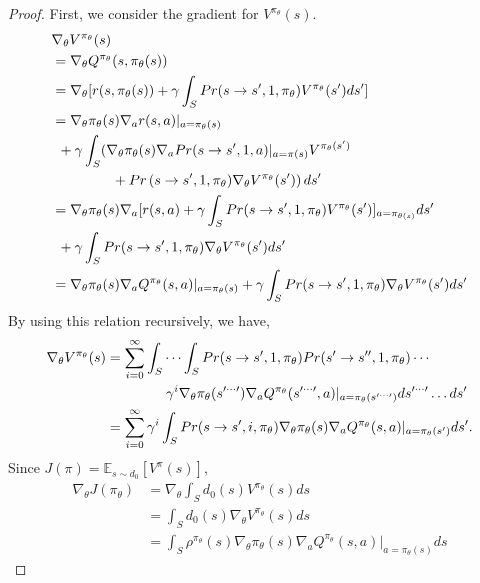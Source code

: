 \documentclass[english, dvipdfmx]{ampmt}             %
\newcommand{\expect}{\mathbb{E}}
\begin{document}
\begin{proof}
First, we consider the gradient for $V^{\pi_{\theta}}(s)$.
\begin{align}
	& \nabla_{\theta}V^{\pi_{\theta}}(s) \nonumber \\ 
	&= \nabla_{\theta}Q^{\pi_{\theta}}(s, \pi_{\theta}(s))\nonumber\\
	&= \nabla_{\theta}[r(s,\pi_{\theta}(s))+\gamma\int_{S}Pr(s\to s^{\prime}, 1, \pi_{\theta})V^{\pi_{\theta}}(s^{\prime})ds^{\prime}] \nonumber\\
	&= \nabla_{\theta}\pi_{\theta}(s)\nabla_{a}r(s,a)|_{a=\pi_{\theta}(s)} \nonumber \\
	&\hspace{1ex}+\gamma\int_{S}(\nabla_{\theta}\pi_{\theta}(s)\nabla_aPr(s\to s^{\prime},1,a)|_{a=\pi(s)}V^{\pi_{\theta}(s^{\prime})}\nonumber\\
	&\hspace{10ex}+Pr\left(s\to s^{\prime}, 1, \pi_{\theta})\nabla_{\theta}V^{\pi_{\theta}}(s^{\prime})\right)ds^{\prime}\nonumber\\
	&= \nabla_{\theta}\pi_{\theta}(s)\nabla_a[r(s,a)+\gamma\int_{S}Pr(s\to s^{\prime}, 1, \pi_{\theta})V^{\pi_{\theta}}(s^{\prime})]_{a=\pi_{\theta(s)}}ds^{\prime} \nonumber \\
	&\hspace{1ex}+\gamma\int_{S}Pr(s\to s^{\prime}, 1, \pi_{\theta})\nabla_{\theta}V^{\pi_{\theta}}(s^{\prime})ds^{\prime}\nonumber\\
	&= \nabla_{\theta}\pi_{\theta}(s)\nabla_aQ^{\pi_{\theta}}(s,a)|_{a=\pi_{\theta}(s)} + \gamma\int_{S}Pr(s\to s^{\prime}, 1, \pi_{\theta})\nabla_{\theta}V^{\pi_{\theta}}(s^{\prime})ds^{\prime}
\end{align}
By using this relation recursively, we have,
\begin{align}
	\nabla_{\theta}V^{\pi_{\theta}}(s) &= \sum_{i=0}^{\infty}\int_{S}\cdots\int_{S}Pr(s\to s^{\prime},1,\pi_{\theta})Pr(s^{\prime}\to s^{\prime\prime},1,\pi_{\theta})\cdots\nonumber\\
	&\hspace{10ex}\gamma^i\nabla_{\theta}\pi_{\theta}(s^{\prime\cdots\prime})\nabla_aQ^{\pi_{\theta}}(s^{\prime\cdots\prime},a)|_{a=\pi_{\theta}(s^{\prime\cdots\prime})}ds^{\prime\cdots\prime}\ldots ds^{\prime}\nonumber\\
	&= \sum_{i=0}^{\infty} \gamma^i\int_{S}Pr(s\to s^{\prime}, i, \pi_{\theta})\nabla_{\theta}\pi_{\theta}(s)\nabla_aQ^{\pi_{\theta}}(s,a)|_{a=\pi_{\theta}(s^{\prime})}ds^{\prime}.\label{multiple_integral}
\end{align}
Since $J(\pi) = \expect_{s\sim d_0}[V^{\pi}(s)]$, 
\begin{align}
	\nabla_{\theta}J(\pi_{\theta}) &= \nabla_{\theta}\int_{S}d_0(s)V^{\pi_{\theta}}(s)ds \nonumber\\
	&= \int_{S}d_0(s)\nabla_{\theta}V^{\pi_{\theta}}(s)ds \nonumber\\
	&= \int_{S}\rho^{\pi_{\theta}}(s)\nabla_{\theta}\pi_{\theta}(s)\nabla_aQ^{\pi_{\theta}}(s,a)|_{a=\pi_{\theta}(s)}ds
\end{align}
\end{proof}
\end{document}
